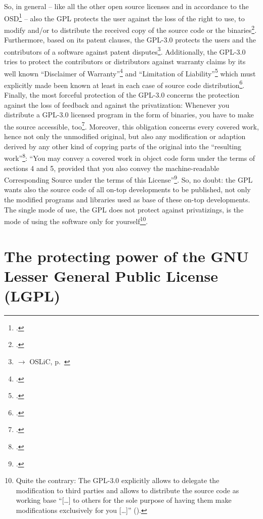 So, in general -- like all the other open source licenses and in accordance to
the OSD\footcite[cf.][\nopage wp]{OSI2012a} -- also the GPL protects the user
against the loss of the right to use, to modify and/or to distribute the
received copy of the source code or the binaries\footcite[cf.][\nopage wp. §3,
§4, §5, and §6]{Gpl30OsiLicense2007a}. Furthermore, based on its patent clauses,
the GPL-3.0 protects the users and the contributors of a software against patent
disputes\footnote{$\rightarrow$ OSLiC, p.\ \pageref{subsec:Gpl30PatentClause}}.
Additionally, the GPL-3.0 tries to protect the contributors or distributors
against warranty claims by its well known \enquote{Disclaimer of
Warranty}\footcite[cf.][\nopage wp. §15]{Gpl30OsiLicense2007a} and
\enquote{Limitation of Liability}\footcite[cf.][\nopage wp.
§16]{Gpl30OsiLicense2007a} which must explicitly made been known at least in
each case of source code distribution\footcite[cf.][\nopage wp.
§4]{Gpl30OsiLicense2007a}. Finally, the most forceful protection of the GPL-3.0
concerns the protection against the loss of feedback and against the
privatization: Whenever you distribute a GPL-3.0 licensed program in the form of
binaries, you have to make the source accessible, too\footcite[cf.][\nopage wp. 
§6]{Gpl30OsiLicense2007a}. Moreover, this obligation concerns every covered
work, hence not only the unmodified original, but also any modification or
adaption derived by any other kind of copying parts of the original into the
\enquote{resulting work}\footcite[cf.][\nopage wp. §0]{Gpl30OsiLicense2007a}:
\enquote{You may convey a covered work in object code form under the terms of
sections 4 and 5, provided that you also convey the machine-readable
Corresponding Source under the terms of this License}\footcite[cf.][\nopage wp. 
§6]{Gpl30OsiLicense2007a}. So, no doubt: the GPL wants also the source code of
all on-top developments to be published, not only the modified programs and
libraries used as base of these on-top developments. The single mode of use, the
GPL does not protect against privatizings, is the mode of using the software
only for yourself\footnote{Quite the contrary: The GPL-3.0 explicitly allows to
delegate the modification to third parties and allows to distribute the source
code as working base \enquote{[\ldots] to others for the sole purpose of having
them make modifications exclusively for you [\ldots]} (\cite[cf.][\nopage wp
. §2]{Gpl30OsiLicense2007a}).}.


\section{The protecting power of the GNU Lesser General Public License (LGPL)}
\label{sec:ProtectingPowerOfLgpl}

